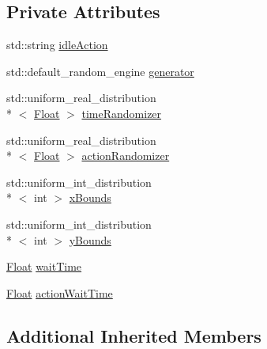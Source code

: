 \subsection*{Private Attributes}
\begin{DoxyCompactItemize}
\item 
std\+::string \hyperlink{classZeta_1_1WanderingMovement_a210f9adaeff521f33dd201fcaf741586}{idle\+Action}
\item 
std\+::default\+\_\+random\+\_\+engine \hyperlink{classZeta_1_1WanderingMovement_a75080229ace2e55afe18ef6f4467423a}{generator}
\item 
std\+::uniform\+\_\+real\+\_\+distribution\\*
$<$ \hyperlink{namespaceZeta_a1e0a1265f9b3bd3075fb0fabd39088ba}{Float} $>$ \hyperlink{classZeta_1_1WanderingMovement_adf4cc859f2b1bf25264282b67a4f31cf}{time\+Randomizer}
\item 
std\+::uniform\+\_\+real\+\_\+distribution\\*
$<$ \hyperlink{namespaceZeta_a1e0a1265f9b3bd3075fb0fabd39088ba}{Float} $>$ \hyperlink{classZeta_1_1WanderingMovement_af47c068896582706813ad211bfc38a6b}{action\+Randomizer}
\item 
std\+::uniform\+\_\+int\+\_\+distribution\\*
$<$ int $>$ \hyperlink{classZeta_1_1WanderingMovement_acf82ca048daf641c7e961495d549fe20}{x\+Bounds}
\item 
std\+::uniform\+\_\+int\+\_\+distribution\\*
$<$ int $>$ \hyperlink{classZeta_1_1WanderingMovement_a860655a4bedc3d86b8d73409fa0a51b8}{y\+Bounds}
\item 
\hyperlink{namespaceZeta_a1e0a1265f9b3bd3075fb0fabd39088ba}{Float} \hyperlink{classZeta_1_1WanderingMovement_ab6b10c55a9ef6c5f0714f88634401a37}{wait\+Time}
\item 
\hyperlink{namespaceZeta_a1e0a1265f9b3bd3075fb0fabd39088ba}{Float} \hyperlink{classZeta_1_1WanderingMovement_a81546d4e7aa3167f9d29070632e484cd}{action\+Wait\+Time}
\end{DoxyCompactItemize}
\subsection*{Additional Inherited Members}


